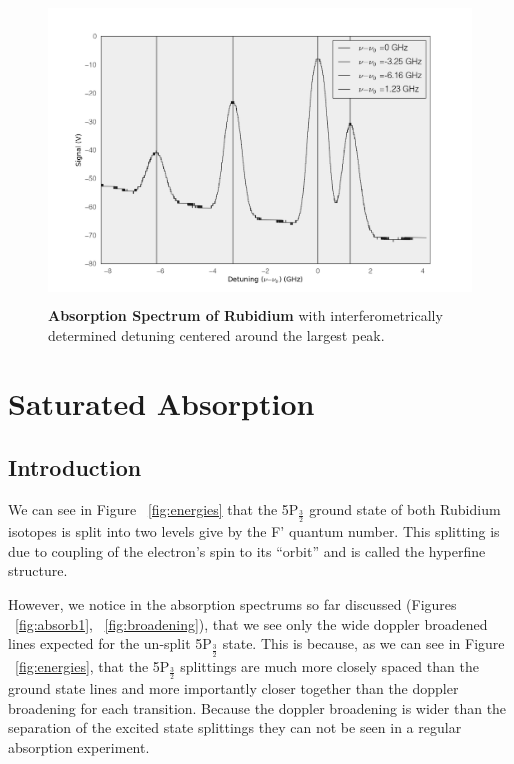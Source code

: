 \documentclass[paper=a4, fontsize=11pt]{scrartcl} %
\numberwithin{equation}{section}
\numberwithin{figure}{section}
\numberwithin{table}{section}
\begin{document}
\begin{figure}[h] \begin{center}
  \includegraphics[height=80mm]{Detuning.png}
  \caption{\textbf{Absorption Spectrum of Rubidium } with
      interferometrically determined detuning centered around the largest peak. }
  \label{fig:detuning}
\end{center} \end{figure}

\section{Saturated Absorption}

\subsection{Introduction}
\label{sec:satabintro}
We can see in Figure ~\ref{fig:energies} that the 5P$_{\frac{3}{2}}$
ground state of both Rubidium isotopes is split into two levels give by the F' quantum
number. This splitting is due to coupling of the electron's spin to
its ``orbit'' and is called the hyperfine structure. 

However, we notice in the absorption spectrums so far discussed
(Figures ~\ref{fig:absorb1}, ~\ref{fig:broadening}), that we see only
the wide doppler broadened lines expected for the un-split
5P$_{\frac{3}{2}}$ state. This is because, as we can see in Figure
~\ref{fig:energies}, that the 5P$_{\frac{3}{2}}$ splittings are much
more closely spaced than the ground state lines and more importantly
closer together than the doppler broadening for each
transition. Because the doppler broadening is wider than the
separation of the excited state splittings they can not be seen in a
regular absorption experiment.
\end{document}
